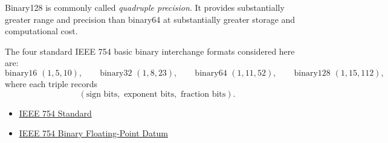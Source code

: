 \begin{remark*}[Interpretation]
Binary128 is commonly called \emph{quadruple precision}. It provides substantially greater
range and precision than binary64 at substantially greater storage and computational cost.
\end{remark*}

\begin{remark*}[Exposition]
\end{remark*}


\begin{remark*}[Exposition]
The four standard IEEE 754 basic binary interchange formats considered here are:
\[
\text{binary16 }(1,5,10),\qquad
\text{binary32 }(1,8,23),\qquad
\text{binary64 }(1,11,52),\qquad
\text{binary128 }(1,15,112),
\]
where each triple records
\[
(\text{sign bits},\text{ exponent bits},\text{ fraction bits}).
\]
\end{remark*}

\begin{dependencies}
\begin{itemize}
  \item \hyperref[def:numerical-analysis-ieee-754-standard]{IEEE 754 Standard}
  \item \hyperref[def:numerical-analysis-ieee-754-binary-floating-point-datum]{IEEE 754 Binary Floating-Point Datum}
\end{itemize}
\end{dependencies}
